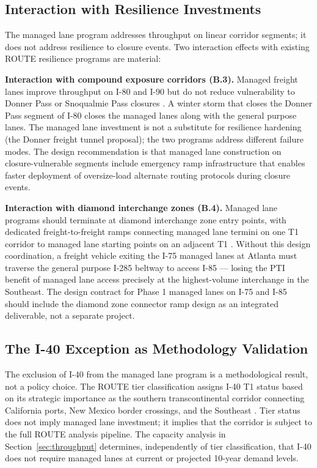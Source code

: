 \subsection{Interaction with Resilience Investments}

The managed lane program addresses throughput on linear corridor segments; it does not address resilience to closure events. Two interaction effects with existing ROUTE resilience programs are material:

\textbf{Interaction with compound exposure corridors (B.3).} Managed freight lanes improve throughput on I-80 and I-90 but do not reduce vulnerability to Donner Pass or Snoqualmie Pass closures \citep{ROUTE_B3}. A winter storm that closes the Donner Pass segment of I-80 closes the managed lanes along with the general purpose lanes. The managed lane investment is not a substitute for resilience hardening (the Donner freight tunnel proposal); the two programs address different failure modes. The design recommendation is that managed lane construction on closure-vulnerable segments include emergency ramp infrastructure that enables faster deployment of oversize-load alternate routing protocols during closure events.

\textbf{Interaction with diamond interchange zones (B.4).} Managed lane programs should terminate at diamond interchange zone entry points, with dedicated freight-to-freight ramps connecting managed lane termini on one T1 corridor to managed lane starting points on an adjacent T1 \citep{ROUTE_B4}. Without this design coordination, a freight vehicle exiting the I-75 managed lanes at Atlanta must traverse the general purpose I-285 beltway to access I-85 --- losing the PTI benefit of managed lane access precisely at the highest-volume interchange in the Southeast. The design contract for Phase 1 managed lanes on I-75 and I-85 should include the diamond zone connector ramp design as an integrated deliverable, not a separate project.

\subsection{The I-40 Exception as Methodology Validation}

The exclusion of I-40 from the managed lane program is a methodological result, not a policy choice. The ROUTE tier classification assigns I-40 T1 status based on its strategic importance as the southern transcontinental corridor connecting California ports, New Mexico border crossings, and the Southeast \citep{ROUTE_A1}. Tier status does not imply managed lane investment; it implies that the corridor is subject to the full ROUTE analysis pipeline. The capacity analysis in Section~\ref{sec:throughput} determines, independently of tier classification, that I-40 does not require managed lanes at current or projected 10-year demand levels.

